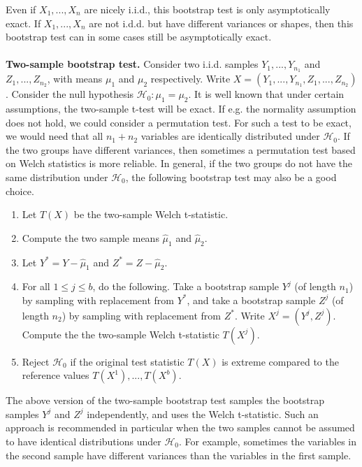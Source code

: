 \documentclass[11pt]{article}
\theoremstyle{plain}
\theoremstyle{definition}
\newcommand{\Hy}{\mathcal{H}}
\newcommand{\citp}{\citep}
\begin{document}
Even if $X_1,...,X_n$ are nicely i.i.d., this bootstrap test is only asymptotically exact. If $X_1,...,X_n$ are not i.d.d. but have different variances or shapes, then this bootstrap test can in some cases still be asymptotically exact.
\\
\\
\textbf{Two-sample bootstrap test.}
Consider two i.i.d. samples $Y_1,...,Y_{n_1}$ and $Z_1,...,Z_{n_2}$, with means  $\mu_1$ and $\mu_2$ respectively. Write $X=(Y_1,...,Y_{n_1}, Z_1,...,Z_{n_2})$. Consider the null hypothesis $\Hy_0: \mu_1=\mu_2$.
It is well known that under certain assumptions, the two-sample t-test will be exact. If e.g. the normality assumption does not hold, we could consider a permutation test. For such a test to be exact, we would need that all $n_1+n_2$ variables are identically distributed under $\Hy_0$. If the two groups have different variances, then sometimes a permutation test based on  Welch statistics \citp{janssen1997studentized} is more reliable.
In general, if the two groups do not have the same distribution under $\Hy_0$, the following bootstrap test may also be a good choice. 
\begin{enumerate}
\item Let $T(X)$ be the two-sample Welch  t-statistic.
\item Compute the two sample means $\hat{\mu}_1$ and $\hat{\mu}_2$.
\item Let $Y^*=Y -\hat{\mu}_1$ and $Z^* = Z- \hat{\mu}_2$.
\item For all $1\leq j \leq b$, do the following. Take a bootstrap sample $Y^j$ (of length $n_1$) by sampling with replacement from $Y^*$, and  take a bootstrap sample $Z^j$ (of length $n_2$) by sampling with replacement from $Z^*$. Write $X^j=(Y^j, Z^j)$. Compute the the two-sample Welch  t-statistic $T(X^j)$.
\item Reject $\Hy_0$ if the original test statistic $T(X)$ is extreme compared to the reference values $T(X^1),...,T(X^b)$.
\end{enumerate} \phantom{.}
The above version of the two-sample bootstrap test samples the bootstrap samples $Y^j$ and $Z^j$ independently, and uses the Welch t-statistic. Such an approach
is recommended in particular when the two samples cannot be assumed to have identical distributions under $\Hy_0$. For example,  sometimes the  variables in the second sample  have different variances than the variables in the first sample. 
\end{document}
